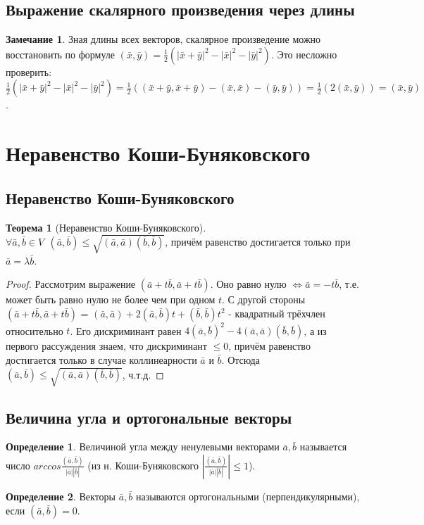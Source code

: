 \documentclass[a4paper, 12pt]{article}
\theoremstyle{definition}
\newtheorem*{definition}{Определение}
\newtheorem*{theorem}{Теорема}
\newtheorem*{remark}{Замечание}
\begin{document}
	\subsection{Выражение скалярного произведения через длины}
	\begin{remark}
		Зная длины всех векторов, скалярное произведение можно восстановить по формуле $(\bar{x}, \bar{y}) = \frac{1}{2}(|\bar{x} + \bar{y}|^2 - |\bar{x}|^2 - |\bar{y}|^2)$. Это несложно проверить: \\
		$\frac{1}{2}(|\bar{x} + \bar{y}|^2 - |\bar{x}|^2 - |\bar{y}|^2) = \frac{1}{2}((\bar{x} + \bar{y}, \bar{x} + \bar{y}) - (\bar{x}, \bar{x}) - (\bar{y}, \bar{y})) = \frac{1}{2}(2(\bar{x}, \bar{y})) = (\bar{x}, \bar{y})$.
	\end{remark}
	\section{Неравенство Коши-Буняковского}
	\subsection{Неравенство Коши-Буняковского}
	\begin{theorem}[Неравенство Коши-Буняковского]
		$\forall \bar{a}, \bar{b} \in V \ \ (\bar{a}, \bar{b}) \leqslant \sqrt{(\bar{a}, \bar{a})(\bar{b}, \bar{b})}$, причём равенство достигается только при $\bar{a} = \lambda\bar{b}$.
	\end{theorem}
	\begin{proof}
		Рассмотрим выражение $(\bar{a} + t\bar{b}, \bar{a} + t\bar{b})$. Оно равно нулю $\Leftrightarrow \bar{a} = -t\bar{b}$, т.е. может быть равно нулю не более чем при одном $t$. С другой стороны
		$(\bar{a} + t\bar{b}, \bar{a} + t\bar{b})$ = $(\bar{a}, \bar{a}) + 2(\bar{a}, \bar{b})t + (\bar{b}, \bar{b})t^2$ - квадратный трёхчлен относительно $t$. Его дискриминант равен $4(\bar{a}, \bar{b})^2 - 4(\bar{a}, \bar{a})(\bar{b}, \bar{b})$, а из первого рассуждения знаем, что дискриминант $\leqslant 0$, причём равенство достигается только в случае коллинеарности $\bar{a}$ и $\bar{b}$. Отсюда $(\bar{a}, \bar{b}) \leqslant \sqrt{(\bar{a}, \bar{a})(\bar{b}, \bar{b})}$, ч.т.д.
	\end{proof}
	\subsection{Величина угла и ортогональные векторы}
	\begin{definition}
		Величиной угла между ненулевыми векторами $\bar{a}, \bar{b}$  называется число $arccos\frac{(\bar{a}, \bar{b})}{|\bar{a}||\bar{b}|}$ (из н. Коши-Буняковского $|\frac{(\bar{a}, \bar{b})}{|\bar{a}||\bar{b}|}| \leqslant 1$).
	\end{definition}
	\begin{definition}
		Векторы $\bar{a}, \bar{b}$ называются ортогональными (перпендикулярными), если $(\bar{a}, \bar{b}) = 0$.
	\end{definition}
\end{document}
